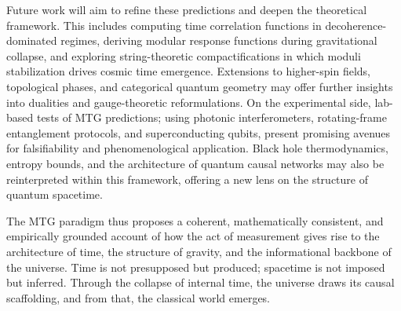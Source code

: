 \documentclass[11pt]{article}
\begin{document}
Future work will aim to refine these predictions and deepen the theoretical framework. This includes computing time correlation functions in decoherence-dominated regimes, deriving modular response functions during gravitational collapse, and exploring string-theoretic compactifications in which moduli stabilization drives cosmic time emergence. Extensions to higher-spin fields, topological phases, and categorical quantum geometry may offer further insights into dualities and gauge-theoretic reformulations. On the experimental side, lab-based tests of MTG predictions; using photonic interferometers, rotating-frame entanglement protocols, and superconducting qubits, present promising avenues for falsifiability and phenomenological application. Black hole thermodynamics, entropy bounds, and the architecture of quantum causal networks may also be reinterpreted within this framework, offering a new lens on the structure of quantum spacetime.

The MTG paradigm thus proposes a coherent, mathematically consistent, and empirically grounded account of how the act of measurement gives rise to the architecture of time, the structure of gravity, and the informational backbone of the universe. Time is not presupposed but produced; spacetime is not imposed but inferred. Through the collapse of internal time, the universe draws its causal scaffolding, and from that, the classical world emerges.



\end{document}
